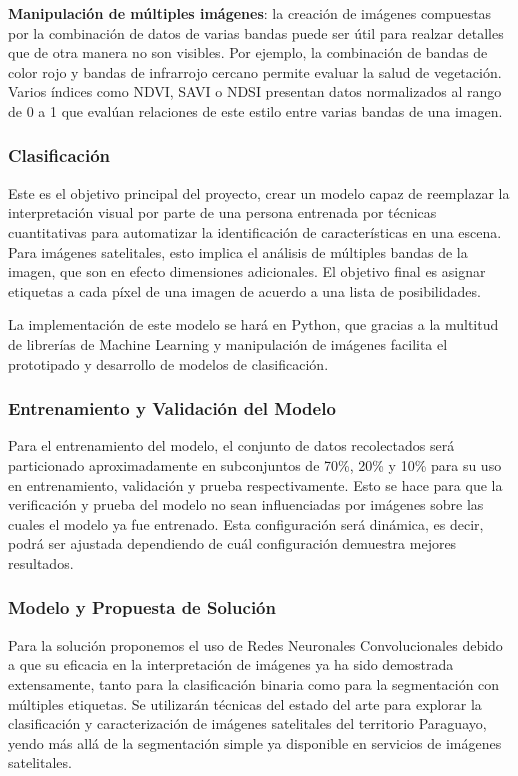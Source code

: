 {\bf Manipulación de múltiples imágenes}: la creación de imágenes compuestas por la combinación de datos de varias
bandas puede ser útil para realzar detalles que de otra manera no son visibles. Por ejemplo, la combinación de bandas
de color rojo y bandas de infrarrojo cercano permite evaluar la salud de vegetación. Varios índices como NDVI, SAVI o
NDSI presentan datos normalizados al rango de 0 a 1 que evalúan relaciones de este estilo entre varias bandas de una
imagen.

\subsubsection{Clasificación}

Este es el objetivo principal del proyecto, crear un modelo capaz de reemplazar la interpretación visual por parte de
una persona entrenada por técnicas cuantitativas para automatizar la identificación de características en una escena.
Para imágenes satelitales, esto implica el análisis de múltiples bandas de la imagen, que son en efecto dimensiones
adicionales. El objetivo final es asignar etiquetas a cada píxel de una imagen de acuerdo a una lista de posibilidades.

La implementación de este modelo se hará en Python, que gracias a la multitud de librerías de Machine Learning y
manipulación de imágenes facilita el prototipado y desarrollo de modelos de clasificación.

\subsubsection{Entrenamiento y Validación del Modelo}

Para el entrenamiento del modelo, el conjunto de datos recolectados será particionado aproximadamente en subconjuntos
de 70\%, 20\% y 10\% para su uso en entrenamiento, validación y prueba respectivamente. Esto se hace para que la
verificación y prueba del modelo no sean influenciadas por imágenes sobre las cuales el modelo ya fue entrenado. Esta
configuración será dinámica, es decir, podrá ser ajustada dependiendo de cuál configuración demuestra mejores
resultados.

\subsubsection{Modelo y Propuesta de Solución}

Para la solución proponemos el uso de Redes Neuronales Convolucionales debido a que su eficacia en la interpretación de
imágenes ya ha sido demostrada extensamente, tanto para la clasificación binaria como para la segmentación con
múltiples etiquetas. Se utilizarán técnicas del estado del arte para explorar la clasificación y caracterización de
imágenes satelitales del territorio Paraguayo, yendo más allá de la segmentación simple ya disponible en servicios de
imágenes satelitales.

